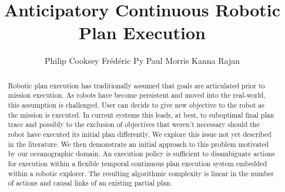 \documentclass[letterpaper]{article}
\begin{document}
\title{Anticipatory Continuous Robotic Plan Execution}
\author{Philip Cooksey \And Fr\'ed\'eric Py \And Paul Morris \And Kanna Rajan}
\maketitle{}

\begin{abstract}

  Robotic plan execution has traditionally assumed that goals are
  articulated prior to mission execution. As robots have become
  persistent and moved into the real-world, this assumption is
  challenged. User can decide to give new objective to the robot 
  as the mission is executed. In current systems this leads, at best, to
  suboptimal final plan trace and possibly to the exclusion of
  objectives that weren't necessary should the robot have executed its
  initial plan differently. 
  We explore this issue not yet described in the literature.
  We then demonstrate an initial approach to this
  problem motivated by our oceanographic domain.  An execution policy
  is sufficient to disambiguate actions for execution
  within a flexible temporal continuous plan execution system embedded
  within a robotic explorer.  The resulting algorithmic complexity is
  linear in the number of actions and causal links of an existing
  partial plan.

\end{abstract}






 






\twocolumn 


\end{document}
